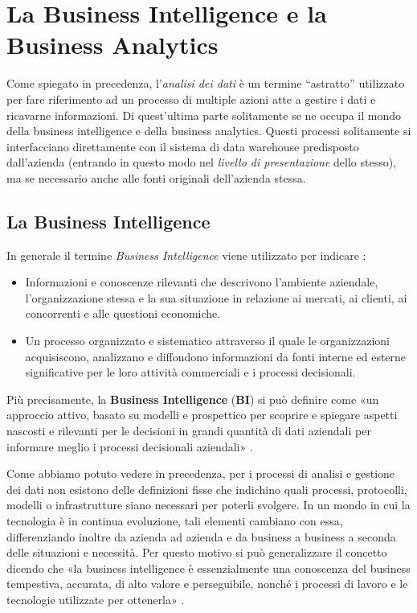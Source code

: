 \chapter{La Business Intelligence e la Business Analytics}
\label{ch:Business Intelligence and Analytics}

Come spiegato in precedenza, l'\textit{analisi dei dati} è un termine ``astratto'' utilizzato per fare riferimento ad un processo di multiple azioni atte a gestire i dati e ricavarne informazioni. Di quest'ultima parte solitamente se ne occupa il mondo della business intelligence e della business analytics. Questi processi solitamente si interfacciano direttamente con il sistema di data warehouse predisposto dall'azienda (entrando in questo modo nel \textit{livello di presentazione} dello stesso), ma se necessario anche alle fonti originali dell'azienda stessa.  

\section{La Business Intelligence}
In generale il termine \textit{Business Intelligence} viene utilizzato per indicare \cite{meauserement_of_bi}:

\begin{itemize}
    \item Informazioni e conoscenze rilevanti che descrivono l'ambiente aziendale, l'organizzazione stessa e la sua situazione in relazione ai mercati, ai clienti, ai concorrenti e alle questioni economiche.
    \item Un processo organizzato e sistematico attraverso il quale le organizzazioni acquisiscono, analizzano e diffondono informazioni da fonti interne ed esterne significative per le loro attività commerciali e i processi decisionali.
\end{itemize}

Più precisamente, la \textbf{Business Intelligence} (\textbf{BI}) si può definire come «un approccio attivo, basato su modelli e prospettico per scoprire e spiegare aspetti nascosti e rilevanti per le decisioni in grandi quantità di dati aziendali per informare meglio i processi decisionali aziendali» \cite{bi_strategic_intelligence}.

Come abbiamo potuto vedere in precedenza, per i processi di analisi e gestione dei dati non esistono delle definizioni fisse che indichino quali processi, protocolli, modelli o infrastrutture siano necessari per poterli svolgere. In un mondo in cui la tecnologia è in continua evoluzione, tali elementi cambiano con essa, differenziando inoltre da azienda ad azienda e da business a business a seconda delle situazioni e necessità. Per questo motivo si può generalizzare il concetto dicendo che «la business intelligence è essenzialmente una conoscenza del business tempestiva, accurata, di alto valore e perseguibile, nonché i processi di lavoro e le tecnologie utilizzate per ottenerla» \cite{bi_for_dummies}.

